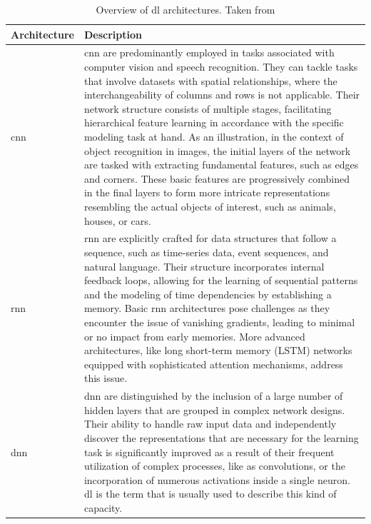\begin{table}[H]
  \centering
  \begin{tabular}{|p{3cm}|p{11cm}|}
    \hline
    \textbf{Architecture} & \textbf{Description} \\
    \hline
    \acrlong{cnn} & \acrshort{cnn} are predominantly employed in tasks associated with computer vision and speech recognition. They can tackle tasks that involve datasets with spatial relationships, where the interchangeability of columns and rows is not applicable. Their network structure consists of multiple stages, facilitating hierarchical feature learning in accordance with the specific modeling task at hand. As an illustration, in the context of object recognition in images, the initial layers of the network are tasked with extracting fundamental features, such as edges and corners. These basic features are progressively combined in the final layers to form more intricate representations resembling the actual objects of interest, such as animals, houses, or cars. \\
    \hline
    \acrlong{rnn} & \acrshort{rnn} are explicitly crafted for data structures that follow a sequence, such as time-series data, event sequences, and natural language. Their structure incorporates internal feedback loops, allowing for the learning of sequential patterns and the modeling of time dependencies by establishing a memory. Basic \acrshort{rnn} architectures pose challenges as they encounter the issue of vanishing gradients, leading to minimal or no impact from early memories. More advanced architectures, like long short-term memory (LSTM) networks equipped with sophisticated attention mechanisms, address this issue. \\
    \hline
    \acrlong{dnn} & \acrshort{dnn} are distinguished by the inclusion of a large number of hidden layers that are grouped in complex network designs. Their ability to handle raw input data and independently discover the representations that are necessary for the learning task is significantly improved as a result of their frequent utilization of complex processes, like as convolutions, or the incorporation of numerous activations inside a single neuron. \acrshort{dl} is the term that is usually used to describe this kind of capacity.\\
    \hline
  \end{tabular}
  \caption{Overview of \acrshort{dl} architectures. Taken from \cite{janiesch2021machine}}
  \label{tab:typesofDL}
\end{table}

